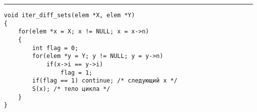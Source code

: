 \vspace{5pt} \hrule
\begin{lstlisting}[caption={Итератор разности множеств}, label=p_47_iter_diff_sets, escapechar=\%]
void iter_diff_sets(elem *X, elem *Y)
{
	for(elem *x = X; x != NULL; x = x->n)
	{
		int flag = 0;
		for(elem *y = Y; y != NULL; y = y->n)
			if(x->i == y->i)
				flag = 1;
		if(flag == 1) continue; /* следующий x */
		S(x); /* тело цикла */
	}
}
\end{lstlisting}
